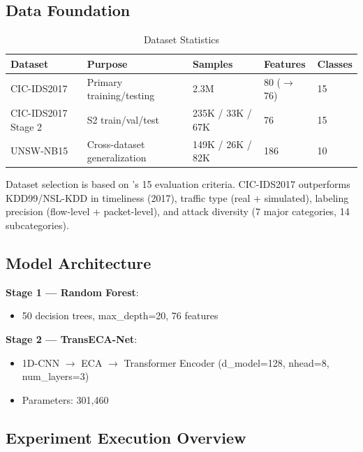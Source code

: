 \documentclass[sigconf]{acmart}
\begin{document}
\subsection{Data Foundation}

\begin{table}[H]
\caption{Dataset Statistics}
\label{tab:datasets}
\begin{tabular}{lllll}
\toprule
\textbf{Dataset} & \textbf{Purpose} & \textbf{Samples} & \textbf{Features} & \textbf{Classes} \\
\midrule
CIC-IDS2017 & Primary training/testing & 2.3M & 80 ($\to$76) & 15 \\
CIC-IDS2017 Stage 2 & S2 train/val/test & 235K / 33K / 67K & 76 & 15 \\
UNSW-NB15 & Cross-dataset generalization & 149K / 26K / 82K & 186 & 10 \\
\bottomrule
\end{tabular}
\end{table}

Dataset selection is based on \cite{16}'s 15 evaluation criteria. CIC-IDS2017 outperforms KDD99/NSL-KDD in timeliness (2017), traffic type (real + simulated), labeling precision (flow-level + packet-level), and attack diversity (7 major categories, 14 subcategories).

\subsection{Model Architecture}
\textbf{Stage 1 --- Random Forest}:
\begin{itemize}
\item 50 decision trees, max\_depth=20, 76 features
\end{itemize}

\textbf{Stage 2 --- TransECA-Net}:
\begin{itemize}
\item 1D-CNN $\to$ ECA \cite{23} $\to$ Transformer Encoder (d\_model=128, nhead=8, num\_layers=3)
\item Parameters: 301,460
\end{itemize}

\subsection{Experiment Execution Overview}
\end{document}
